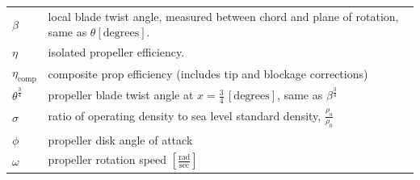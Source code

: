 \documentclass[
]{book}
\begin{document}
\begin{longtable}[]{@{}ll@{}}
\begin{minipage}[t]{0.14\columnwidth}
\(\beta\)\strut
\end{minipage} & \begin{minipage}[t]{0.80\columnwidth}\raggedright
local blade twist angle, measured between chord and plane of rotation, same as \(\theta \left[ \text{degrees} \right]\).\strut
\end{minipage}\tabularnewline
\begin{minipage}[t]{0.14\columnwidth}\raggedright
\(\eta\)\strut
\end{minipage} & \begin{minipage}[t]{0.80\columnwidth}\raggedright
isolated propeller efficiency.\strut
\end{minipage}\tabularnewline
\begin{minipage}[t]{0.14\columnwidth}\raggedright
\(\eta_{\text{comp}}\)\strut
\end{minipage} & \begin{minipage}[t]{0.80\columnwidth}\raggedright
composite prop efficiency (includes tip and blockage corrections)\strut
\end{minipage}\tabularnewline
\begin{minipage}[t]{0.14\columnwidth}\raggedright
\(\theta^{\frac{3}{4}}\)\strut
\end{minipage} & \begin{minipage}[t]{0.80\columnwidth}\raggedright
propeller blade twist angle at \(x = \frac{3}{4} \, \left[ \text{degrees} \right]\), same as \(\beta^{\frac{3}{4}}\)\strut
\end{minipage}\tabularnewline
\begin{minipage}[t]{0.14\columnwidth}\raggedright
\(\sigma\)\strut
\end{minipage} & \begin{minipage}[t]{0.80\columnwidth}\raggedright
ratio of operating density to sea level standard density, \(\frac{\rho_a}{\rho_0}\)\strut
\end{minipage}\tabularnewline
\begin{minipage}[t]{0.14\columnwidth}\raggedright
\(\phi\)\strut
\end{minipage} & \begin{minipage}[t]{0.80\columnwidth}\raggedright
propeller disk angle of attack\strut
\end{minipage}\tabularnewline
\begin{minipage}[t]{0.14\columnwidth}\raggedright
\(\omega\)\strut
\end{minipage} & \begin{minipage}[t]{0.80\columnwidth}\raggedright
propeller rotation speed \(\left[ \frac{\text{rad}}{\text{sec}} \right]\)\strut
\end{minipage}\tabularnewline
\bottomrule
\end{longtable}
\end{document}
